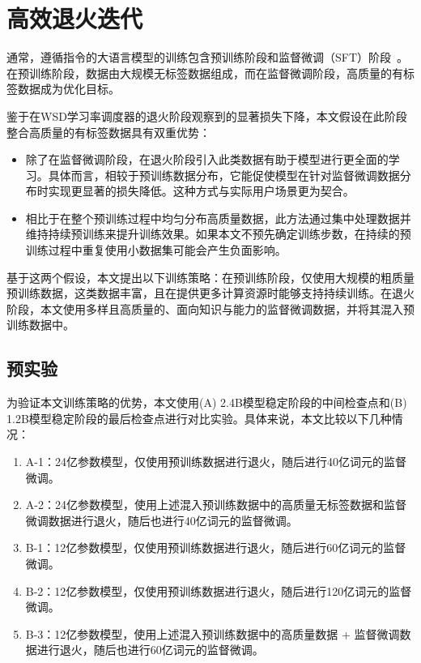 

\section{高效退火迭代}
\label{sec:trainingstrategy}
通常，遵循指令的大语言模型的训练包含预训练阶段和监督微调（SFT）阶段~\citep{zhang2023instruction,wei2021finetuned}。在预训练阶段，数据由大规模无标签数据组成，而在监督微调阶段，高质量的有标签数据成为优化目标。

鉴于在WSD学习率调度器的退火阶段观察到的显著损失下降，本文假设在此阶段整合高质量的有标签数据具有双重优势：
\begin{itemize}
    \item 除了在监督微调阶段，在退火阶段引入此类数据有助于模型进行更全面的学习。具体而言，相较于预训练数据分布，它能促使模型在针对监督微调数据分布时实现更显著的损失降低。这种方式与实际用户场景更为契合。
    \item 相比于在整个预训练过程中均匀分布高质量数据，此方法通过集中处理数据并维持持续预训练来提升训练效果。如果本文不预先确定训练步数，在持续的预训练过程中重复使用小数据集可能会产生负面影响。
\end{itemize}

基于这两个假设，本文提出以下训练策略：在预训练阶段，仅使用大规模的粗质量预训练数据，这类数据丰富，且在提供更多计算资源时能够支持持续训练。在退火阶段，本文使用多样且高质量的、面向知识与能力的监督微调数据，并将其混入预训练数据中。

\subsection{预实验}
为验证本文训练策略的优势，本文使用(A) 2.4B模型稳定阶段的中间检查点和(B) 1.2B模型稳定阶段的最后检查点进行对比实验。具体来说，本文比较以下几种情况：

\begin{enumerate}
    \item A-1：24亿参数模型，仅使用预训练数据进行退火，随后进行40亿词元的监督微调。
    \item A-2：24亿参数模型，使用上述混入预训练数据中的高质量无标签数据和监督微调数据进行退火，随后也进行40亿词元的监督微调。
    \item B-1：12亿参数模型，仅使用预训练数据进行退火，随后进行60亿词元的监督微调。
    \item B-2：12亿参数模型，仅使用预训练数据进行退火，随后进行120亿词元的监督微调。
    \item B-3：12亿参数模型，使用上述混入预训练数据中的高质量数据 + 监督微调数据进行退火，随后也进行60亿词元的监督微调。 
\end{enumerate}

